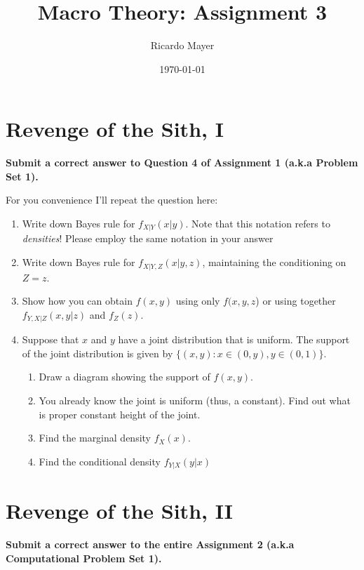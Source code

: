 \documentclass[11pt]{article}
\begin{document}
\title{Macro Theory: Assignment 3}
\author{Ricardo Mayer}
\date{\today}
\maketitle


\section{Revenge of the Sith, I}
\textbf{Submit a correct answer to Question 4 of Assignment 1 (a.k.a Problem Set 1).}

For you convenience I'll repeat the question here:

\begin{enumerate}
\item Write down Bayes rule for $f_{X|Y}(x|y)$. Note that this notation refers to \emph{densities}! Please employ the same notation in your answer

\item Write down Bayes rule for $f_{X|Y,Z}(x|y,z)$, maintaining the conditioning on $Z=z$.

\item Show how  you can obtain $f(x,y)$ using only $f(x,y,z$) or using together $f_{Y,X|Z}(x,y|z)$ and $f_{Z}(z)$.

\item Suppose that $x$ and $y$ have a joint distribution that is uniform. The support of the joint distribution is given by $\{(x,y): x \in (0,y), y \in (0,1)\}$.
   \begin{enumerate}
     \item Draw a diagram showing the support of $f(x,y)$.
   
     \item You already know the joint is uniform (thus, a constant). Find out what is proper constant height of the joint.
   
     \item Find the marginal density  $f_X(x)$.
   
     \item Find the conditional density $f_{Y|X}(y|x)$   
   \end{enumerate}

\end{enumerate}

\section{Revenge of the Sith, II}
\textbf{Submit a correct answer to the entire Assignment 2 (a.k.a Computational Problem Set 1).}
\end{document}
